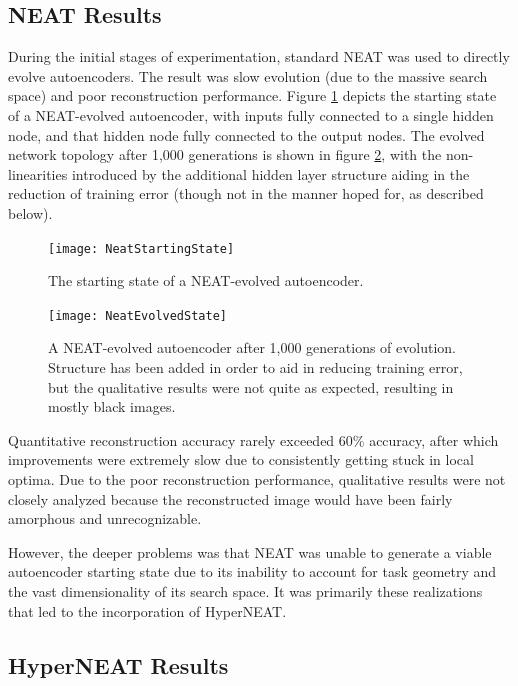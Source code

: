 \documentclass{acm_proc_article-sp}
\begin{document}
\subsection{NEAT Results}
During the initial stages of experimentation, standard NEAT was used to directly evolve autoencoders.  The result was slow evolution (due to the massive search space) and poor reconstruction performance.  Figure \ref{figure:neatstartingnetwork} depicts the starting state of a NEAT-evolved autoencoder, with inputs fully connected to a single hidden node, and that hidden node fully connected to the output nodes.  The evolved network topology after 1,000 generations is shown in figure \ref{figure:neatevolvednetwork}, with the non-linearities introduced by the additional hidden layer structure aiding in the reduction of training error (though not in the manner hoped for, as described below).

\begin{figure}[h]
	\caption{The starting state of a NEAT-evolved autoencoder.}
	\centering
	\texttt{[image: NeatStartingState]}
	\label{figure:neatstartingnetwork}
\end{figure}

\begin{figure}[h]
	\caption{A NEAT-evolved autoencoder after 1,000 generations of evolution.  Structure has been added in order to aid in reducing training error, but the qualitative results were not quite as expected, resulting in mostly black images.}
	\centering
	\texttt{[image: NeatEvolvedState]}
	\label{figure:neatevolvednetwork}
\end{figure}

Quantitative reconstruction accuracy rarely exceeded 60\% accuracy, after which improvements were extremely slow due to consistently getting stuck in local optima.  Due to the poor reconstruction performance, qualitative results were not closely analyzed because the reconstructed image would have been fairly amorphous and unrecognizable.

However, the deeper problems was that NEAT was unable to generate a viable autoencoder starting state due to its inability to account for task geometry and the vast dimensionality of its search space.  It was primarily these realizations that led to the incorporation of HyperNEAT.

\subsection{HyperNEAT Results}
\end{document}
